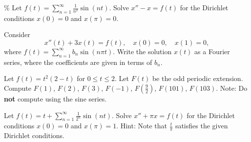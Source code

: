 \documentclass{ximera}
\begin{document}
\begin{exercise}\%
    Let $f(t) = \sum_{n=1}^\infty \frac{1}{n^2} \sin(nt)$.  Solve $x''- x = f(t)$ for the Dirichlet conditions $x(0) = 0$ and $x(\pi) = 0$.
\end{exercise}

\begin{exercise}
    Consider
    \begin{equation*}
        x''(t) + 3 x(t) = f(t) , \quad x(0) = 0, \quad x(1) = 0,
    \end{equation*}
    where $f(t) = \sum_{n=1}^\infty b_n \sin (n \pi t)$.  Write the solution $x(t)$ as a Fourier series, where the coefficients are given in terms of $b_n$.
\end{exercise}

\begin{exercise}
    Let $f(t) = t^2(2-t)$ for $0 \leq t \leq 2$.  Let $F(t)$ be the odd periodic extension.  Compute $F(1)$, $F(2)$, $F(3)$, $F(-1)$, $F(\frac{9}{2})$, $F(101)$, $F(103)$.  Note: Do \textbf{not} compute using the sine series.
\end{exercise}

\begin{exercise}%
    Let $f(t) = t + \sum_{n=1}^\infty \frac{1}{2^n} \sin(nt)$.  Solve $x'' + \pi x = f(t)$ for the Dirichlet conditions $x(0) = 0$ and $x(\pi) = 1$.  Hint:  Note that $\frac{t}{\pi}$ satisfies the given Dirichlet conditions.
\end{exercise}

\end{document}
